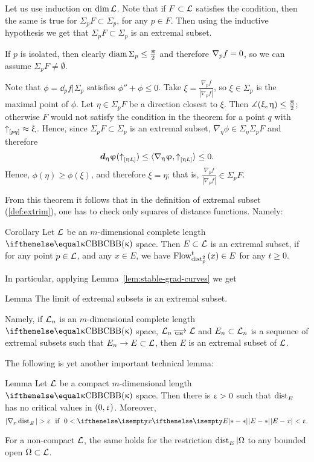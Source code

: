 Let us use induction on $\mathop{\rm dim}\nolimits \mathcal{L}$. 
Note that if $F\subset \spc{L}$ satisfies the condition,
then the same is true for $\Sigma_p F\subset\Sigma_p$, for any $p\in F$.
Then using the inductive hypothesis we get that $\Sigma_p F\subset \Sigma_p$ is an extremal subset.

If $p$ is isolated, then clearly $\diam \Sigma_p\le \tfrac\pi2$ and therefore $\nabla_p
f=0$, so we can assume $\Sigma_p F\not=\emptyset$. 

Note that $\phi=\dd_p f|\Sigma_p$ satisfies $\phi''+\phi\le 0$.
Take $\xi=\tfrac{\nabla_p f}{|\nabla_p f|}$, so 
$\xi\in \Sigma_p$ is the maximal point of $\phi$.
Let $\eta\in \Sigma_p F$ be a direction closest  to $\xi$. Then
$\mangle(\xi,\eta)\le \tfrac\pi2$; 
otherwise $F$ would not satisfy the condition in the theorem for a point $q$ with $\dir{p}{q}\approx\xi$.
Hence, since $\Sigma_p F\subset \Sigma_p$ is an extremal subset, $\nabla_\eta\phi\in \Sigma_\eta \Sigma_p F$ and
therefore 
\[\dd_\eta\phi(\dir\eta\xi)
\le
\<\nabla_\eta\phi,\dir\eta\xi\>\le0.\]
Hence, $\phi(\eta)\ge\phi(\xi)$, and therefore $\xi=\eta$; 
that is, $\tfrac{\nabla_p f}{|\nabla_p f|}\in \Sigma_p F$. 
\qeds

From this theorem it follows that in the definition of extremal subset (\ref{def:extrim}),
one has to check only squares of distance functions. 
Namely:

\begin{thm}{Corollary}
Let $\mathcal{L}$ be an $m$-dimensional complete length $\Alex\kappa$ space. 
Then $E\subset \spc{L}$ is an extremal subset, if for any point $p\in \spc{L}$, and any $x\in E$, we
have $\GF_{\distfun[2]{p}{}{}}^t(x)\in E$ for any $t\ge 0$.
\end{thm}

In particular, applying Lemma~\ref{lem:stable-grad-curves} we get

\begin{thm}{Lemma}
\label{lem:limit-extr} The limit of extremal subsets is an extremal subset. 

Namely, if $\mathcal{L}_n$ is an $m$-dimensional complete length $\Alex\kappa$ space, $\spc{L}_n\GHto \spc{L}$  and $E_n\subset \spc{L}_n$ is a sequence
of extremal subsets such that $E_n\to E\subset \spc{L}$, then $E$ is an extremal subset of
$\mathcal{L}$. 
\end{thm}

The following is yet another important technical lemma:

\begin{thm} {Lemma} {\rm \cite[3.1(2)]{perelman-petrunin:extremal}}
\label{lem:dist-to-extr}
Let $\mathcal{L}$ be a compact $m$-dimensional length $\Alex\kappa$ space. 
Then there is $\upvarepsilon>0$
such that $\mathop{\rm dist}\nolimits_{E}^{{}}{}{}$ has no critical values in $(0,\upvarepsilon)$. 
Moreover,
\[|\nabla_x\distfun{E}{}{}|>\eps\ \ \text{if}\ \ 0<\dist{E}{x}{}<\eps.\]

For a non-compact $\mathcal{L}$,  the same holds 
for the restriction
 $\mathop{\rm dist}\nolimits_{E}^{{}}{}{}|\Omega$ to any bounded open $\Omega\subset \spc{L}$.
\end{thm}



